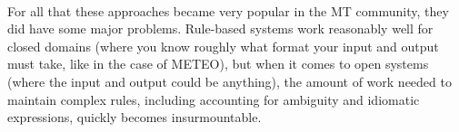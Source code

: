 \paragraph{}{For all that these approaches became very popular in the
  MT community, they did have some major problems. Rule-based systems
  work reasonably well for closed domains (where you know roughly what
  format your input and output must take, like in the case of METEO),
  but when it comes to open systems (where the input and output could
  be anything), the amount of work needed to maintain complex rules,
  including accounting for ambiguity and idiomatic expressions,
  quickly becomes insurmountable.}

